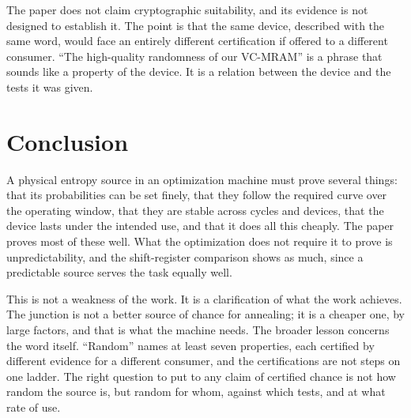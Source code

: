 \documentclass[11pt]{article}
\theoremstyle{definition}
\theoremstyle{remark}
\begin{document}
The paper does not claim cryptographic suitability, and its evidence is not designed to establish it. The point is that the same device, described with the same word, would face an entirely different certification if offered to a different consumer. ``The high-quality randomness of our VC-MRAM'' is a phrase that sounds like a property of the device. It is a relation between the device and the tests it was given.

\section{Conclusion}

A physical entropy source in an optimization machine must prove several things: that its probabilities can be set finely, that they follow the required curve over the operating window, that they are stable across cycles and devices, that the device lasts under the intended use, and that it does all this cheaply. The paper proves most of these well. What the optimization does not require it to prove is unpredictability, and the shift-register comparison shows as much, since a predictable source serves the task equally well.

This is not a weakness of the work. It is a clarification of what the work achieves. The junction is not a better source of chance for annealing; it is a cheaper one, by large factors, and that is what the machine needs. The broader lesson concerns the word itself. ``Random'' names at least seven properties, each certified by different evidence for a different consumer, and the certifications are not steps on one ladder. The right question to put to any claim of certified chance is not how random the source is, but random for whom, against which tests, and at what rate of use.
\end{document}
